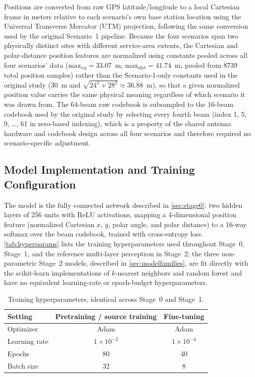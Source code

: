 \documentclass{iutbscthesis}
\begin{document}
Positions are converted from raw GPS latitude/longitude to a local Cartesian frame in meters relative to each scenario's own base station location using the Universal Transverse Mercator (UTM) projection, following the same conversion used by the original Scenario~1 pipeline. Because the four scenarios span two physically distinct sites with different service-area extents, the Cartesian and polar-distance position features are normalized using constants pooled across all four scenarios' data ($\text{max}_{xy} = 33.07$~m, $\text{max}_{\text{dist}} = 41.74$~m, pooled from 8739 total position samples) rather than the Scenario-1-only constants used in the original study (30~m and $\sqrt{24^2+28^2}\approx 36.88$~m), so that a given normalized position value carries the same physical meaning regardless of which scenario it was drawn from. The 64-beam raw codebook is subsampled to the 16-beam codebook used by the original study by selecting every fourth beam (index 1, 5, 9, \ldots, 61 in zero-based indexing), which is a property of the shared antenna hardware and codebook design across all four scenarios and therefore required no scenario-specific adjustment.

\subsection{Model Implementation and Training Configuration}

The model is the fully connected network described in \autoref{sec:stage0}: two hidden layers of 256 units with ReLU activations, mapping a 4-dimensional position feature (normalized Cartesian $x$, $y$, polar angle, and polar distance) to a 16-way softmax over the beam codebook, trained with cross-entropy loss. \autoref{tab:hyperparams} lists the training hyperparameters used throughout Stage~0, Stage~1, and the reference multi-layer perceptron in Stage~2; the three non-parametric Stage~2 models, described in \autoref{sec:modelfamilies}, are fit directly with the scikit-learn implementations of $k$-nearest neighbors and random forest and have no equivalent learning-rate or epoch-budget hyperparameters.

\begin{table}[H]
    \centering
    \begin{tabular}{l c c}
        \toprule
        Setting & Pretraining / source training & Fine-tuning \\
        \midrule
        Optimizer & Adam & Adam \\
        Learning rate & $1\times10^{-2}$ & $1\times10^{-4}$ \\
        Epochs & 80 & 40 \\
        Batch size & 32 & 8 \\
        \bottomrule
    \end{tabular}
    \caption{Training hyperparameters, identical across Stage~0 and Stage~1.}
    \label{tab:hyperparams}
\end{table}
\end{document}
